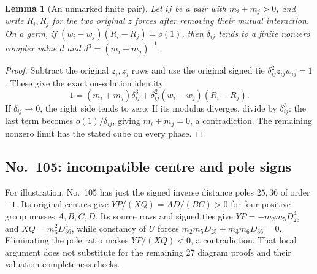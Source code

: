\documentclass[11pt]{amsart}
\newtheorem{lemma}[theorem]{Lemma}
\theoremstyle{remark}
\begin{document}
\begin{lemma}[An unmarked finite pair]\label{lem:reported-finite-pair}
Let $ij$ be a pair with $m_i+m_j>0$, and write $R_i,R_j$ for the two original $z$ forces after removing their mutual interaction. On a germ, if $(w_i-w_j)(R_i-R_j)=o(1)$, then $\delta_{ij}$ tends to a finite nonzero complex value $d$ and $d^3=(m_i+m_j)^{-1}$.
\end{lemma}
\begin{proof}
Subtract the original $z_i,z_j$ rows and use the original signed tie $\delta_{ij}^2z_{ij}w_{ij}=1$. These give the exact on-solution identity
\begin{equation}\label{eq:finite-pair-identity}
1=(m_i+m_j)\delta_{ij}^3+\delta_{ij}^2(w_i-w_j)(R_i-R_j).
\end{equation}
If $\delta_{ij}\to0$, the right side tends to zero. If its modulus diverges, divide by $\delta_{ij}^3$: the last term becomes $o(1)/\delta_{ij}$, giving $m_i+m_j=0$, a contradiction. The remaining nonzero limit has the stated cube on every phase.
\end{proof}

\subsection{No.~105: incompatible centre and pole signs}\label{sec:no105-sign}
For illustration, No.~105 has just the signed inverse distance
poles $25,36$ of order $-1$. Its original centres give
$YP/(XQ)=AD/(BC)>0$ for four positive group masses
$A,B,C,D$. Its source rows and signed ties give
$YP=-m_2m_5D_{25}^4$ and $XQ=m_6^2D_{36}^4$, while
constancy of $U$ forces
$m_2m_5D_{25}+m_3m_6D_{36}=0$. Eliminating the pole
ratio makes $YP/(XQ)<0$, a contradiction. That local
argument does not substitute for the remaining 27 diagram
proofs and their valuation-completeness checks.
\end{document}
